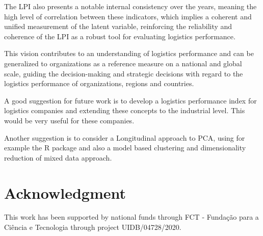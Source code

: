\documentclass[conference]{IEEEtran}
\begin{document}
The LPI also presents a notable internal consistency over the years, meaning the high level of correlation between these indicators, which  implies a coherent and unified measurement of the latent variable, reinforcing the reliability and coherence of the LPI as a robust tool for evaluating logistics performance.

This vision contributes to an understanding of logistics performance and can be generalized to organizations as a reference measure on a national and global scale, guiding the decision-making and strategic decisions with regard to the logistics performance of organizations, regions and countries.

A good suggestion for future work is to develop a logistics performance index for logistics companies and extending these concepts to the industrial level. This would be very useful for these companies. 

Another suggestion is to consider a Longitudinal approach to PCA, using for example the R package \cite{jarmund2022alasca} and also a model based clustering and dimensionality reduction of mixed data \cite{ranalli2017model} approach.




\section*{Acknowledgment}

This work has been supported by national funds through FCT - Fundação para a Ciência e Tecnologia through project UIDB/04728/2020.






\end{document}
